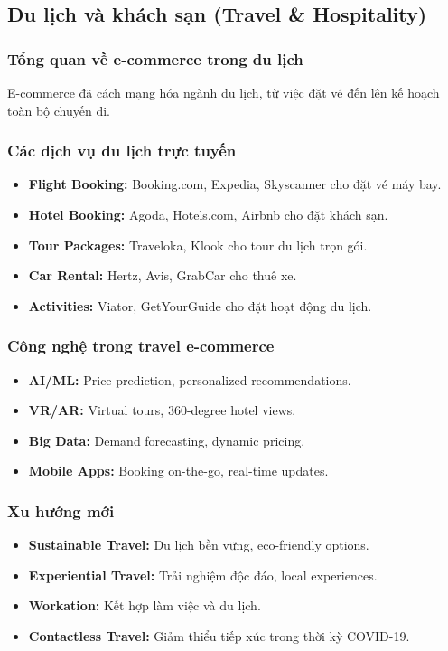 \documentclass[a4paper,12pt]{report}
\begin{document}
\subsection{Du lịch và khách sạn (Travel \& Hospitality)}

\subsubsection{Tổng quan về e-commerce trong du lịch}
E-commerce đã cách mạng hóa ngành du lịch, từ việc đặt vé đến lên kế hoạch toàn bộ chuyến đi.

\subsubsection{Các dịch vụ du lịch trực tuyến}
\begin{itemize}
    \item \textbf{Flight Booking:} Booking.com, Expedia, Skyscanner cho đặt vé máy bay.
    \item \textbf{Hotel Booking:} Agoda, Hotels.com, Airbnb cho đặt khách sạn.
    \item \textbf{Tour Packages:} Traveloka, Klook cho tour du lịch trọn gói.
    \item \textbf{Car Rental:} Hertz, Avis, GrabCar cho thuê xe.
    \item \textbf{Activities:} Viator, GetYourGuide cho đặt hoạt động du lịch.
\end{itemize}

\subsubsection{Công nghệ trong travel e-commerce}
\begin{itemize}
    \item \textbf{AI/ML:} Price prediction, personalized recommendations.
    \item \textbf{VR/AR:} Virtual tours, 360-degree hotel views.
    \item \textbf{Big Data:} Demand forecasting, dynamic pricing.
    \item \textbf{Mobile Apps:} Booking on-the-go, real-time updates.
\end{itemize}

\subsubsection{Xu hướng mới}
\begin{itemize}
    \item \textbf{Sustainable Travel:} Du lịch bền vững, eco-friendly options.
    \item \textbf{Experiential Travel:} Trải nghiệm độc đáo, local experiences.
    \item \textbf{Workation:} Kết hợp làm việc và du lịch.
    \item \textbf{Contactless Travel:} Giảm thiểu tiếp xúc trong thời kỳ COVID-19.
\end{itemize}
\end{document}
